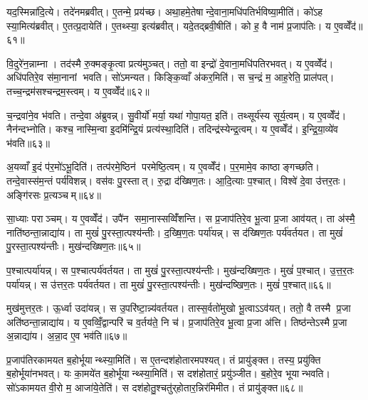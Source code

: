यद॒स्मिन्ना॑दि॒त्ये। तदे॑नमब्रवीत्। ए॒तन्मे॒ प्रय॑च्छ। अथा॒हमे॒तेषान्दे॒वाना॒मधि॑पतिर्भविष्या॒मीति॑। को॑ऽह स्या॒मित्य॑ब्रवीत्। ए॒तत्प्र॒दायेति॑। ए॒तथ्स्या॒ इत्य॑ब्रवीत्। यदे॒तद्ब्रवी॒षीति॑। को ह॒ वै नाम॑ प्र॒जाप॑तिः। य ए॒वव्वेँद॑॥६१॥

वि॒दुरे॑न॒न्नाम्ना। तद॑स्मै रु॒क्मङ्कृ॒त्वा प्रत्य॑मुञ्चत्। ततो॒ वा इन्द्रो॑ दे॒वाना॒मधि॑पतिरभवत्। य ए॒वव्वेँद॑। अधि॑पतिरे॒व स॑मा॒नानां भवति। सो॑ऽमन्यत। किङ्कि॒व्वाँ अ॑कर॒मिति॑। स च॒न्द्रं म॒ आह॒रेति॒ प्राल॑पत्। तच्च॒न्द्रम॑सश्चन्द्रम॒स्त्वम्। य ए॒वव्वेँद॑॥६२॥

च॒न्द्रवा॑ने॒व भ॑वति। तन्दे॒वा अ॑ब्रुवन्न्। सु॒वीर्यो॑ मर्या॒ यथा॑ गोपा॒यत॒ इति॑। तथ्सूर्य॑स्य सूर्य॒त्वम्। य ए॒वव्वेँद॑। नैन॑न्दभ्नोति। कश्च॒ नास्मि॒न्वा इ॒दमि॑न्द्रि॒यं प्रत्य॑स्था॒दिति॑। तदिन्द्र॑स्येन्द्र॒त्वम्। य ए॒वव्वेँद॑। इ॒न्द्रि॒या॒व्ये॑व भ॑वति॥६३॥

अ॒यव्वाँ इ॒दं प॑र॒मो॑ऽभू॒दिति॑। तत्प॑रमे॒ष्ठिन॑ परमेष्ठि॒त्वम्। य ए॒वव्वेँद॑। प॒र॒मामे॒व काष्ठाङ्गच्छति। तन्दे॒वास्स॑म॒न्तं पर्य॑विशन्न्। वस॑वः पु॒रस्तात्। रु॒द्रा द॑ख्षिण॒तः। आ॒दि॒त्याः प॒श्चात्। विश्वे॑ दे॒वा उ॑त्तर॒तः। अङ्गि॑रसः प्र॒त्यञ्चम्॥६४॥

सा॒ध्याः पराञ्चम्। य ए॒वव्वेँद॑। उपै॑न समा॒नास्सव्विँ॑शन्ति। स प्र॒जाप॑तिरे॒व भू॒त्वा प्र॒जा आव॑यत्। ता अ॑स्मै॒ नाति॑ष्ठन्ता॒न्नाद्या॑य। ता मुखं॑ पु॒रस्ता॒त्पश्य॑न्तीः। द॒ख्षि॒ण॒तः पर्या॑यन्न्। स द॑ख्षिण॒तः पर्य॑वर्तयत। ता मुखं॑ पु॒रस्ता॒त्पश्य॑न्तीः। मुख॑न्दख्षिण॒तः॥६५॥

प॒श्चात्पर्या॑यन्न्। स प॒श्चात्पर्य॑वर्तयत। ता मुखं॑ पु॒रस्ता॒त्पश्य॑न्तीः। मुख॑न्दख्षिण॒तः। मुखं॑ प॒श्चात्। उ॒त्त॒र॒तः पर्या॑यन्न्। स उ॑त्तर॒तः पर्य॑वर्तयत। ता मुखं॑ पु॒रस्ता॒त्पश्य॑न्तीः। मुख॑न्दष्खिण॒तः। मुखं॑ प॒श्चात्॥६६॥

मुख॑मुत्तर॒तः। ऊ॒र्ध्वा उदा॑यन्न्। स उ॒परि॑ष्टा॒न्न्य॑वर्तयत। तास्स॒र्वतो॑मुखो भू॒त्वाऽऽव॑यत्। ततो॒ वै तस्मै प्र॒जा अति॑ष्ठन्ता॒न्नाद्या॑य। य ए॒वव्विँ॒द्वान्परि॑ च व॒र्तय॑ते॒ नि च॑। प्र॒जाप॑तिरे॒व भू॒त्वा प्र॒जा अ॑त्ति। तिष्ठ॑न्तेऽस्मै प्र॒जा अ॒न्नाद्या॑य। अ॒न्ना॒द ए॒व भव॑ति॥६७॥\anuvakamend[आ॒सी॒द्वेद॑ चन्द्रम॒स्त्वय्यँ ए॒वव्वेँदेन्द्रिया॒व्ये॑व भ॑वति प्र॒त्यञ्चं॒ मुख॑न्दख्षिण॒तो मुखं॑ प॒श्चान्नव॑ च]

प्र॒जाप॑तिरकामयत ब॒होर्भूयान्थ्स्या॒मिति॑। स ए॒तन्दश॑होतारमपश्यत्। तं प्रायु॑ङ्क्त। तस्य॒ प्रयु॑क्ति ब॒होर्भूया॑नभवत्। यः का॒मये॑त ब॒होर्भूयान्थ्स्या॒मिति॑। स दश॑होतारं॒ प्रयु॑ञ्जीत। ब॒होरे॒व भूयान्भवति। सो॑ऽकामयत वी॒रो म॒ आजा॑ये॒तेति॑। स दश॑होतु॒श्चतु॑र्‌होतार॒न्निर॑मिमीत। तं प्रायु॑ङ्क्त॥६८॥

